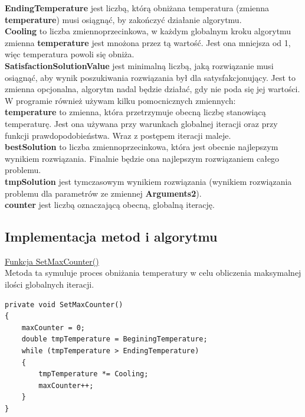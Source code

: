 \documentclass[twoside]{projektInzynierskiMS1}
\newcommand{\si}{ś}
\begin{document}
\textbf{EndingTemperature} jest liczbą, którą obniżana temperatura (zmienna \textbf{temperature}) musi osiągnąć, by zakończyć działanie algorytmu. \\

\textbf{Cooling} to liczba zmiennoprzecinkowa, w każdym globalnym kroku algorytmu zmienna \textbf{temperature} jest mnożona przez tą warto\si ć. Jest ona mniejsza od 1, więc temperatura powoli się obniża. \\

\textbf{SatisfactionSolutionValue} jest minimalną liczbą, jaką rozwiązanie musi osiągnąć, aby wynik poszukiwania rozwiązania był dla satysfakcjonujący. Jest to zmienna opcjonalna, algorytm nadal będzie działać, gdy nie poda się jej warto\si ci.\\

W programie również używam kilku pomocnicznych zmiennych: \\

\textbf{temperature} to zmienna, która przetrzymuje obecną liczbę stanowiącą temperaturę. Jest ona używana przy warunkach globalnej iteracji oraz przy funkcji prawdopodobieństwa. Wraz z postępem iteracji maleje. \\

\textbf{bestSolution} to liczba zmiennoprzecinkowa, która jest obecnie najlepszym wynikiem rozwiązania. Finalnie będzie ona najlepszym rozwiązaniem całego problemu. \\

\textbf{tmpSolution} jest tymczasowym wynikiem rozwiązania (wynikiem rozwiązania problemu dla parametrów ze zmiennej \textbf{Arguments2}). \\

\textbf{counter} jest liczbą oznaczającą obecną, globalną iterację. \\

\subsection{Implementacja metod i algorytmu}

\underline{Funkcja SetMaxCounter()} \\
Metoda ta symuluje proces obniżania temperatury w celu obliczenia maksymalnej ilo\si ci globalnych iteracji. \\
\begin{verbatim}
private void SetMaxCounter()
{
    maxCounter = 0;
    double tmpTemperature = BeginingTemperature;
    while (tmpTemperature > EndingTemperature)
    {
        tmpTemperature *= Cooling;
        maxCounter++;
    }
}
\end{verbatim}
\end{document}
